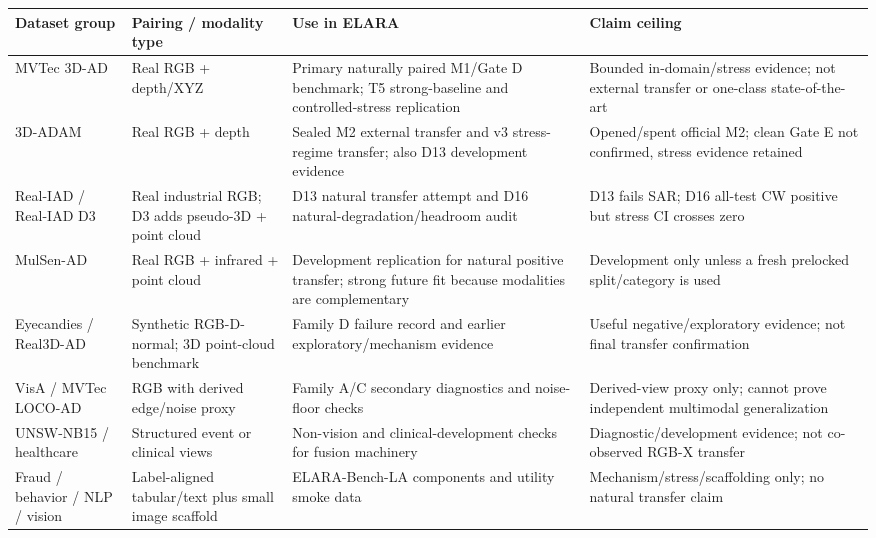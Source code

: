 \begin{tabular}{L{0.16\textwidth}L{0.18\textwidth}L{0.34\textwidth}L{0.25\textwidth}}
\toprule
Dataset group & Pairing / modality type & Use in ELARA & Claim ceiling \\
\midrule
MVTec 3D-AD & Real RGB + depth/XYZ & Primary naturally paired M1/Gate D benchmark; T5 strong-baseline and controlled-stress replication & Bounded in-domain/stress evidence; not external transfer or one-class state-of-the-art \\
3D-ADAM & Real RGB + depth & Sealed M2 external transfer and v3 stress-regime transfer; also D13 development evidence & Opened/spent official M2; clean Gate E not confirmed, stress evidence retained \\
Real-IAD / Real-IAD D3 & Real industrial RGB; D3 adds pseudo-3D + point cloud & D13 natural transfer attempt and D16 natural-degradation/headroom audit & D13 fails SAR; D16 all-test CW positive but stress CI crosses zero \\
MulSen-AD & Real RGB + infrared + point cloud & Development replication for natural positive transfer; strong future fit because modalities are complementary & Development only unless a fresh prelocked split/category is used \\
Eyecandies / Real3D-AD & Synthetic RGB-D-normal; 3D point-cloud benchmark & Family D failure record and earlier exploratory/mechanism evidence & Useful negative/exploratory evidence; not final transfer confirmation \\
VisA / MVTec LOCO-AD & RGB with derived edge/noise proxy & Family A/C secondary diagnostics and noise-floor checks & Derived-view proxy only; cannot prove independent multimodal generalization \\
UNSW-NB15 / healthcare & Structured event or clinical views & Non-vision and clinical-development checks for fusion machinery & Diagnostic/development evidence; not co-observed RGB-X transfer \\
Fraud / behavior / NLP / vision & Label-aligned tabular/text plus small image scaffold & ELARA-Bench-LA components and utility smoke data & Mechanism/stress/scaffolding only; no natural transfer claim \\
\bottomrule
\end{tabular}
